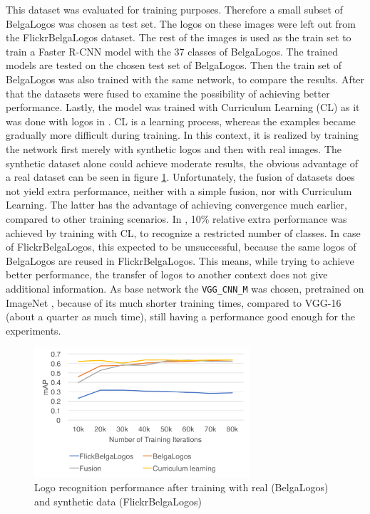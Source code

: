 This dataset was evaluated for training purposes. Therefore a small subset of BelgaLogos was chosen as test set. The logos on these images were left out from the FlickrBelgaLogos dataset. The rest of the images is used as the train set to train a Faster R-CNN model with the 37 classes of BelgaLogos. The trained models are tested on the chosen test set of BelgaLogos. Then the train set of BelgaLogos was also trained with the same network, to compare the results. After that the datasets were fused to examine the possibility of achieving better performance. Lastly, the model was trained with Curriculum Learning \cite{Bengio_curriculumlearning} (CL) as it was done with logos in \cite{DBLP:journals/corr/SuZG16}. CL is a learning process, whereas the examples became gradually more difficult during training. In this context, it is realized by training the network first merely with synthetic logos and then with real images.
\bigbreak
The synthetic dataset alone could achieve moderate results, the obvious advantage of a real dataset can be seen in figure \ref{f:flbltrain}. Unfortunately, the fusion of datasets does not yield extra performance, neither with a simple fusion, nor with Curriculum Learning. The latter has the advantage of achieving convergence much earlier, compared to other training scenarios. In \cite{DBLP:journals/corr/SuZG16}, 10\% relative extra performance was achieved by training with CL, to recognize a restricted number of classes. In case of FlickrBelgaLogos, this expected to be unsuccessful, because the same logos of BelgaLogos are reused in FlickrBelgaLogos. This means, while trying to achieve better performance, the transfer of logos to another context does not give additional information. As base network the \texttt{VGG\_CNN\_M} \cite{Chatfield14} was chosen, pretrained on ImageNet \cite{imagenet_cvpr09}, because of its much shorter training times, compared to VGG-16 (about a quarter as much time), still having a performance good enough for the experiments.
\begin{figure}
  \centering
  \includegraphics[width=80mm]{images/mt/bltest.pdf}
  \caption{Logo recognition performance after training with real (BelgaLogos) and synthetic data (FlickrBelgaLogos)}
  \label{f:flbltrain}
\end{figure}

